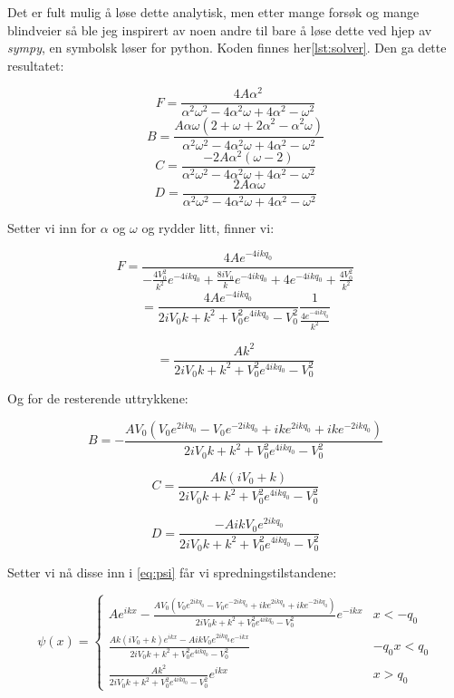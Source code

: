 \documentclass[a4paper,norsk, 10pt]{article}
\numberwithin{equation}{section}
\begin{document}
Det er fult mulig å løse dette analytisk, men etter mange forsøk og mange blindveier så ble jeg inspirert av noen andre til bare å løse dette ved hjep av \textit{sympy}, en symbolsk løser for python. Koden finnes her\ref{lst:solver}. Den ga dette resultatet:

$$
F = \frac{4A\alpha^2}{\alpha^2\omega^2 - 4\alpha^2\omega + 4\alpha^2 - \omega^2}
$$
$$
B = \frac{A\alpha\omega(2+\omega +2\alpha^2 - \alpha^2\omega)}{\alpha^2\omega^2 - 4\alpha^2\omega + 4\alpha^2 - \omega^2}
$$
$$
C = \frac{-2A\alpha^2(\omega - 2)}{\alpha^2\omega^2 - 4\alpha^2\omega + 4\alpha^2 - \omega^2}
$$
$$
D = \frac{2A\alpha\omega}{\alpha^2\omega^2 - 4\alpha^2\omega + 4\alpha^2 - \omega^2}
$$

Setter vi inn for $\alpha$ og $\omega$ og rydder litt, finner vi:

$$
F = \frac{4Ae^{-4ikq_0}}{-\frac{4V_0^2}{k^2}e^{-4ikq_0} + \frac{8iV_0}{k}e^{-4ikq_0} + 4e^{-4ikq_0} + \frac{4V_0^2}{k^2}}
$$
$$
= \frac{4Ae^{-4ikq_0}}{2iV_0k + k^2 +V_0^2e^{4ikq_0} - V_0^2}\frac{1}{\frac{4e^{-4ikq_0}}{k^2}}
$$

\begin{equation}
= \frac{Ak^2}{2iV_0k + k^2 +V_0^2e^{4ikq_0} - V_0^2}
\label{eq:F}
\end{equation}

Og for de resterende uttrykkene:

\begin{equation}
B = -\frac{AV_0\left(V_0e^{2ikq_0} - V_0e^{-2ikq_0} + ike^{2ikq_0} + ike^{-2ikq_0}\right)}{2iV_0k + k^2 +V_0^2e^{4ikq_0} - V_0^2}
\label{eq:B}
\end{equation}

\begin{equation}
C = \frac{Ak(iV_0 + k)}{2iV_0k + k^2 +V_0^2e^{4ikq_0} - V_0^2}
\label{eq:C}
\end{equation}

\begin{equation}
D = \frac{-AikV_0e^{2ikq_0}}{2iV_0k + k^2 +V_0^2e^{4ikq_0} - V_0^2}
\label{eq:D}
\end{equation}

Setter vi nå disse inn i \eqref{eq:psi} får vi spredningstilstandene:

\begin{equation}
\psi(x) =
\begin{cases}
Ae^{ikx} -\frac{AV_0\left(V_0e^{2ikq_0} - V_0e^{-2ikq_0} + ike^{2ikq_0} + ike^{-2ikq_0}\right)}{2iV_0k + k^2 +V_0^2e^{4ikq_0} - V_0^2}e^{-ikx} & x< -q_0 \\
\frac{Ak(iV_0 + k)e^{ikx} -AikV_0e^{2ikq_0}e^{-ikx}}{2iV_0k + k^2 +V_0^2e^{4ikq_0} - V_0^2} & -q_0x< q_0 \\
\frac{Ak^2}{2iV_0k + k^2 +V_0^2e^{4ikq_0} - V_0^2}e^{ikx} & x>q_0 
\end{cases}
\end{equation}
\end{document}

